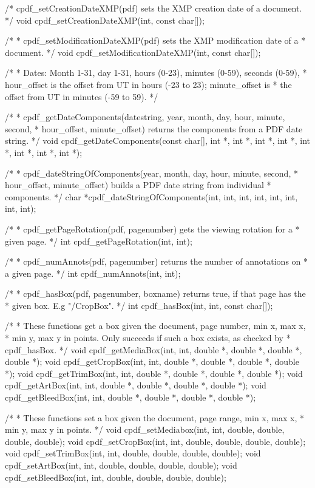 /* cpdf_setCreationDateXMP(pdf) sets the XMP creation date of a document. */
void cpdf_setCreationDateXMP(int, const char[]);

/*
 * cpdf_setModificationDateXMP(pdf) sets the XMP modification date of a
 * document.
 */
void cpdf_setModificationDateXMP(int, const char[]);

/*
 * Dates: Month 1-31, day 1-31, hours (0-23), minutes (0-59), seconds (0-59),
 * hour_offset is the offset from UT in hours (-23 to 23); minute_offset is
 * the offset from UT in minutes (-59 to 59).
 */

/*
 * cpdf_getDateComponents(datestring, year, month, day, hour, minute, second,
 * hour_offset, minute_offset) returns the components from a PDF date string.
 */
void cpdf_getDateComponents(const char[], int *, int *, int *, int *, int *,
                            int *, int *, int *);

/*
 * cpdf_dateStringOfComponents(year, month, day, hour, minute, second,
 * hour_offset, minute_offset) builds a PDF date string from individual
 * components.
 */
char *cpdf_dateStringOfComponents(int, int, int, int, int, int, int, int);

/*
 * cpdf_getPageRotation(pdf, pagenumber) gets the viewing rotation for a
 * given page.
 */
int cpdf_getPageRotation(int, int);

/*
 * cpdf_numAnnots(pdf, pagenumber) returns the number of annotations on
 * a given page.
 */
int cpdf_numAnnots(int, int);

/*
 * cpdf_hasBox(pdf, pagenumber, boxname) returns true, if that page has the
 * given box. E.g "/CropBox".
 */
int cpdf_hasBox(int, int, const char[]);

/*
 * These functions get a box given the document, page number, min x, max x,
 * min y, max y in points. Only succeeds if such a box exists, as checked by
 * cpdf_hasBox.
 */
void cpdf_getMediaBox(int, int, double *, double *, double *, double *);
void cpdf_getCropBox(int, int, double *, double *, double *, double *);
void cpdf_getTrimBox(int, int, double *, double *, double *, double *);
void cpdf_getArtBox(int, int, double *, double *, double *, double *);
void cpdf_getBleedBox(int, int, double *, double *, double *, double *);

/*
 * These functions set a box given the document, page range, min x, max x,
 * min y, max y in points.
 */
void cpdf_setMediabox(int, int, double, double, double, double);
void cpdf_setCropBox(int, int, double, double, double, double);
void cpdf_setTrimBox(int, int, double, double, double, double);
void cpdf_setArtBox(int, int, double, double, double, double);
void cpdf_setBleedBox(int, int, double, double, double, double);

